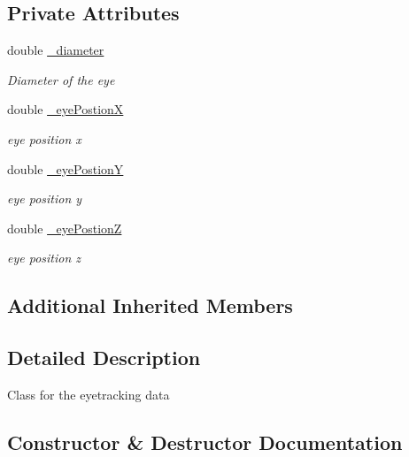 \subsection*{Private Attributes}
\begin{DoxyCompactItemize}
\item 
double \hyperlink{class_web_analyzer_1_1_models_1_1_data_model_1_1_eye_tracking_data_a3cdac1c3e4271e126c3310dc4e61ab0b}{\+\_\+diameter}
\begin{DoxyCompactList}\small\item\em Diameter of the eye \end{DoxyCompactList}\item 
double \hyperlink{class_web_analyzer_1_1_models_1_1_data_model_1_1_eye_tracking_data_af659819843df096a6d7cb0a1529dff17}{\+\_\+eye\+Postion\+X}
\begin{DoxyCompactList}\small\item\em eye position x \end{DoxyCompactList}\item 
double \hyperlink{class_web_analyzer_1_1_models_1_1_data_model_1_1_eye_tracking_data_a6cd742d66dfc6b47af922538b8b9aed1}{\+\_\+eye\+Postion\+Y}
\begin{DoxyCompactList}\small\item\em eye position y \end{DoxyCompactList}\item 
double \hyperlink{class_web_analyzer_1_1_models_1_1_data_model_1_1_eye_tracking_data_add61d5594941d08aa4e1a8d2b8912690}{\+\_\+eye\+Postion\+Z}
\begin{DoxyCompactList}\small\item\em eye position z \end{DoxyCompactList}\end{DoxyCompactItemize}
\subsection*{Additional Inherited Members}


\subsection{Detailed Description}
Class for the eyetracking data 



\subsection{Constructor \& Destructor Documentation}
\hypertarget{class_web_analyzer_1_1_models_1_1_data_model_1_1_eye_tracking_data_a019976267c787cca233fa585617604a9}{}
